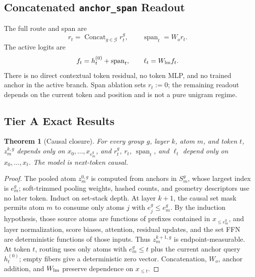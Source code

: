 \documentclass{article}
\theoremstyle{plain}
\newtheorem{theorem}{Theorem}[section]
\theoremstyle{definition}
\theoremstyle{remark}
\begin{document}
\subsection{Concatenated \texttt{anchor\_span} Readout}
\label{sec:mrp6-anchor-span}

The full route and span are
\begin{equation}
r_t=\operatorname{Concat}_{g\in\mathcal G}r_t^g,
\qquad
\operatorname{span}_t=W_o r_t.
\end{equation}
The active logits are
\begin{equation}
f_t=h_t^{(0)}+\operatorname{span}_t,
\qquad
\ell_t=W_{\rm lm}f_t.
\end{equation}
There is no direct contextual token residual, no token MLP, and no trained anchor in the active branch.  Span ablation sets $r_t:=0$; the remaining readout depends on the current token and position and is not a pure unigram regime.

\subsection{Tier A Exact Results}
\label{sec:mrp6-tier-a}

\begin{theorem}[Causal closure]
\label{thm:mrp6-causal-closure}
For every group $g$, layer $k$, atom $m$, and token $t$, $z_m^{k,g}$ depends only on $x_0,\ldots,x_{e_m^g}$, and $r_t^g$, $r_t$, $\operatorname{span}_t$, and $\ell_t$ depend only on $x_0,\ldots,x_t$.  The model is next-token causal.
\end{theorem}

\begin{proof}
The pooled atom $z_m^{0,g}$ is computed from anchors in $S_m^g$, whose largest index is $e_m^g$; soft-trimmed pooling weights, hashed counts, and geometry descriptors use no later token.  Induct on set-stack depth.  At layer $k+1$, the causal set mask permits atom $m$ to consume only atoms $j$ with $e_j^g\le e_m^g$.  By the induction hypothesis, those source atoms are functions of prefixes contained in $x_{\le e_m^g}$, and layer normalization, score biases, attention, residual updates, and the set FFN are deterministic functions of those inputs.  Thus $z_m^{k+1,g}$ is endpoint-measurable.  At token $t$, routing uses only atoms with $e_m^g\le t$ plus the current anchor query $h_t^{(0)}$; empty fibers give a deterministic zero vector.  Concatenation, $W_o$, anchor addition, and $W_{\rm lm}$ preserve dependence on $x_{\le t}$.
\end{proof}
\end{document}

